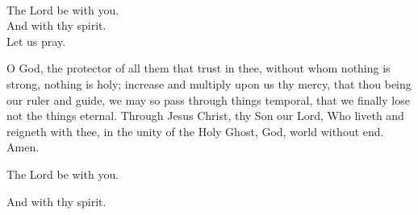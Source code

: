 \\
  \rubric{\Vbar}The Lord be with you.
\\
  \rubric{\Rbar}And with thy spirit.
\\
Let us pray.

O God, the protector of all them that trust in thee, without whom nothing is strong, nothing is holy; increase and multiply upon us thy mercy, that thou being our ruler and guide, we may so pass through things temporal, that we finally lose not the things eternal. Through Jesus Christ, thy Son our Lord, Who liveth and reigneth with thee, in the unity of the Holy Ghost, God, world without end. \rubric{\Rbar} Amen.

  \rubric{\Vbar}The Lord be with you.

  \rubric{\Rbar}And with thy spirit.
